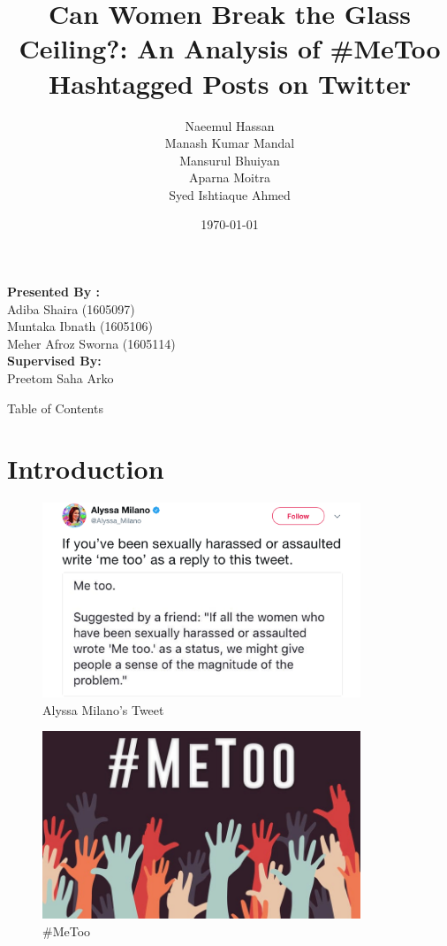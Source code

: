 \documentclass{beamer}
\title[\#MeToo]{Can Women Break the Glass Ceiling?: An Analysis of \#MeToo Hashtagged Posts on Twitter}
\author[BUET]{Naeemul Hassan\\Manash Kumar Mandal\\Mansurul Bhuiyan\\Aparna Moitra\\Syed Ishtiaque Ahmed}
\date{\today}
\begin{document}
	\maketitle
	\begin{frame}
	\centering
		\textbf{Presented By :} \\Adiba Shaira (1605097)\\
		 Muntaka Ibnath (1605106)\\Meher Afroz Sworna (1605114)\\[3 cm]
	 \textbf{Supervised By:} \\Preetom Saha Arko
	\end{frame}
	
	\begin{frame}{Table of Contents}
		\tableofcontents
	\end{frame} 
	\section{Introduction}
	 \begin{frame}
		\begin{figure}[h]
	 		\centering
	 		\includegraphics[width=0.85\textwidth]{alyssa.png}
	 		\newline
	 		\caption{Alyssa Milano's Tweet}
	 	\end{figure}
	 \end{frame}
    \begin{frame}
   \begin{figure}[h]
   	\centering
   	\includegraphics[width=0.85\textwidth]{metoo.jpg}
   	\newline
   	\caption{\#MeToo}
   \end{figure}
\end{frame}
\end{document}
